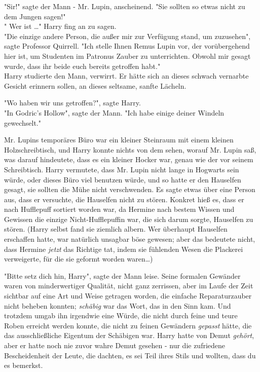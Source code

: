 {"Sir!" sagte der Mann - Mr. Lupin, anscheinend. "Sie sollten so etwas nicht zu dem Jungen sagen!"\\ " Wer ist …" Harry fing an zu sagen.\\ "Die einzige andere Person, die außer mir zur Verfügung stand, um zuzusehen", sagte Professor Quirrell. "Ich stelle Ihnen Remus Lupin vor, der vorübergehend hier ist, um Studenten im Patronus Zauber zu unterrichten. Obwohl mir gesagt wurde, dass ihr beide euch bereits getroffen habt."\\ Harry studierte den Mann, verwirrt. Er hätte sich an dieses schwach vernarbte Gesicht erinnern sollen, an dieses seltsame, sanfte Lächeln.

"Wo haben wir uns getroffen?", sagte Harry.\\ "In Godric's Hollow", sagte der Mann. "Ich habe einige deiner Windeln gewechselt."

Mr. Lupins temporäres Büro war ein kleiner Steinraum mit einem kleinen Holzschreibtisch, und Harry konnte nichts von dem sehen, worauf Mr. Lupin saß, was darauf hindeutete, dass es ein kleiner Hocker war, genau wie der vor seinem Schreibtisch. Harry vermutete, dass Mr. Lupin nicht lange in Hogwarts sein würde, oder dieses Büro viel benutzen würde, und so hatte er den Hauselfen gesagt, sie sollten die Mühe nicht verschwenden. Es sagte etwas über eine Person aus, dass er versuchte, die Hauselfen nicht zu stören. Konkret hieß es, dass er nach Hufflepuff sortiert worden war, da Hermine nach bestem Wissen und Gewissen die einzige Nicht-Hufflepuffin war, die sich darum sorgte, Hauselfen zu stören. (Harry selbst fand sie ziemlich albern. Wer überhaupt Hauselfen erschaffen hatte, war natürlich unsagbar böse gewesen; aber das bedeutete nicht, dass Hermine \emph{jetzt} das Richtige tat, indem sie fühlenden Wesen die Plackerei verweigerte, für die sie geformt worden waren…)

"Bitte setz dich hin, Harry", sagte der Mann leise. Seine formalen Gewänder waren von minderwertiger Qualität, nicht ganz zerrissen, aber im Laufe der Zeit sichtbar auf eine Art und Weise getragen worden, die einfache Reparaturzauber nicht beheben konnten; \emph{schäbig} war das Wort, das in den Sinn kam. Und trotzdem umgab ihn irgendwie eine Würde, die nicht durch feine und teure Roben erreicht werden konnte, die nicht zu feinen Gewändern \emph{gepasst} hätte, die das ausschließliche Eigentum der Schäbigen war. Harry hatte von Demut \emph{gehört}, aber er hatte noch nie zuvor wahre Demut gesehen - nur die zufriedene Bescheidenheit der Leute, die dachten, es sei Teil ihres Stils und wollten, dass du es bemerkst.

}
